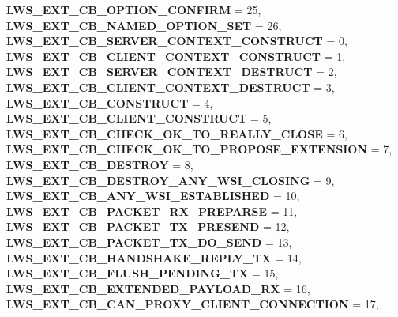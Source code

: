 \begin{DoxyCompactItemize}
{\bfseries L\+W\+S\+\_\+\+E\+X\+T\+\_\+\+C\+B\+\_\+\+O\+P\+T\+I\+O\+N\+\_\+\+C\+O\+N\+F\+I\+RM} = 25, 
{\bfseries L\+W\+S\+\_\+\+E\+X\+T\+\_\+\+C\+B\+\_\+\+N\+A\+M\+E\+D\+\_\+\+O\+P\+T\+I\+O\+N\+\_\+\+S\+ET} = 26, 
{\bfseries L\+W\+S\+\_\+\+E\+X\+T\+\_\+\+C\+B\+\_\+\+S\+E\+R\+V\+E\+R\+\_\+\+C\+O\+N\+T\+E\+X\+T\+\_\+\+C\+O\+N\+S\+T\+R\+U\+CT} = 0, 
\newline
{\bfseries L\+W\+S\+\_\+\+E\+X\+T\+\_\+\+C\+B\+\_\+\+C\+L\+I\+E\+N\+T\+\_\+\+C\+O\+N\+T\+E\+X\+T\+\_\+\+C\+O\+N\+S\+T\+R\+U\+CT} = 1, 
{\bfseries L\+W\+S\+\_\+\+E\+X\+T\+\_\+\+C\+B\+\_\+\+S\+E\+R\+V\+E\+R\+\_\+\+C\+O\+N\+T\+E\+X\+T\+\_\+\+D\+E\+S\+T\+R\+U\+CT} = 2, 
{\bfseries L\+W\+S\+\_\+\+E\+X\+T\+\_\+\+C\+B\+\_\+\+C\+L\+I\+E\+N\+T\+\_\+\+C\+O\+N\+T\+E\+X\+T\+\_\+\+D\+E\+S\+T\+R\+U\+CT} = 3, 
{\bfseries L\+W\+S\+\_\+\+E\+X\+T\+\_\+\+C\+B\+\_\+\+C\+O\+N\+S\+T\+R\+U\+CT} = 4, 
\newline
{\bfseries L\+W\+S\+\_\+\+E\+X\+T\+\_\+\+C\+B\+\_\+\+C\+L\+I\+E\+N\+T\+\_\+\+C\+O\+N\+S\+T\+R\+U\+CT} = 5, 
{\bfseries L\+W\+S\+\_\+\+E\+X\+T\+\_\+\+C\+B\+\_\+\+C\+H\+E\+C\+K\+\_\+\+O\+K\+\_\+\+T\+O\+\_\+\+R\+E\+A\+L\+L\+Y\+\_\+\+C\+L\+O\+SE} = 6, 
{\bfseries L\+W\+S\+\_\+\+E\+X\+T\+\_\+\+C\+B\+\_\+\+C\+H\+E\+C\+K\+\_\+\+O\+K\+\_\+\+T\+O\+\_\+\+P\+R\+O\+P\+O\+S\+E\+\_\+\+E\+X\+T\+E\+N\+S\+I\+ON} = 7, 
{\bfseries L\+W\+S\+\_\+\+E\+X\+T\+\_\+\+C\+B\+\_\+\+D\+E\+S\+T\+R\+OY} = 8, 
\newline
{\bfseries L\+W\+S\+\_\+\+E\+X\+T\+\_\+\+C\+B\+\_\+\+D\+E\+S\+T\+R\+O\+Y\+\_\+\+A\+N\+Y\+\_\+\+W\+S\+I\+\_\+\+C\+L\+O\+S\+I\+NG} = 9, 
{\bfseries L\+W\+S\+\_\+\+E\+X\+T\+\_\+\+C\+B\+\_\+\+A\+N\+Y\+\_\+\+W\+S\+I\+\_\+\+E\+S\+T\+A\+B\+L\+I\+S\+H\+ED} = 10, 
{\bfseries L\+W\+S\+\_\+\+E\+X\+T\+\_\+\+C\+B\+\_\+\+P\+A\+C\+K\+E\+T\+\_\+\+R\+X\+\_\+\+P\+R\+E\+P\+A\+R\+SE} = 11, 
{\bfseries L\+W\+S\+\_\+\+E\+X\+T\+\_\+\+C\+B\+\_\+\+P\+A\+C\+K\+E\+T\+\_\+\+T\+X\+\_\+\+P\+R\+E\+S\+E\+ND} = 12, 
\newline
{\bfseries L\+W\+S\+\_\+\+E\+X\+T\+\_\+\+C\+B\+\_\+\+P\+A\+C\+K\+E\+T\+\_\+\+T\+X\+\_\+\+D\+O\+\_\+\+S\+E\+ND} = 13, 
{\bfseries L\+W\+S\+\_\+\+E\+X\+T\+\_\+\+C\+B\+\_\+\+H\+A\+N\+D\+S\+H\+A\+K\+E\+\_\+\+R\+E\+P\+L\+Y\+\_\+\+TX} = 14, 
{\bfseries L\+W\+S\+\_\+\+E\+X\+T\+\_\+\+C\+B\+\_\+\+F\+L\+U\+S\+H\+\_\+\+P\+E\+N\+D\+I\+N\+G\+\_\+\+TX} = 15, 
{\bfseries L\+W\+S\+\_\+\+E\+X\+T\+\_\+\+C\+B\+\_\+\+E\+X\+T\+E\+N\+D\+E\+D\+\_\+\+P\+A\+Y\+L\+O\+A\+D\+\_\+\+RX} = 16, 
\newline
{\bfseries L\+W\+S\+\_\+\+E\+X\+T\+\_\+\+C\+B\+\_\+\+C\+A\+N\+\_\+\+P\+R\+O\+X\+Y\+\_\+\+C\+L\+I\+E\+N\+T\+\_\+\+C\+O\+N\+N\+E\+C\+T\+I\+ON} = 17, 

\end{DoxyCompactItemize}
